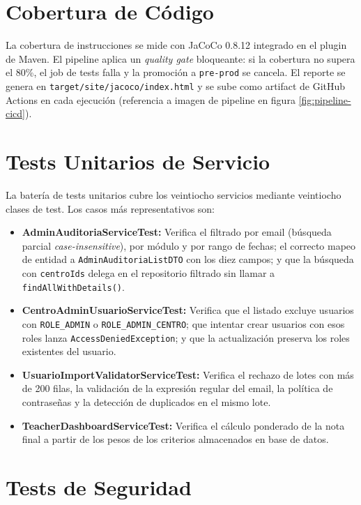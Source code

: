 \documentclass[12pt, a4paper]{report}
\begin{document}
\section{Cobertura de Código}

La cobertura de instrucciones se mide con JaCoCo 0.8.12 integrado en el plugin
de Maven. El pipeline aplica un \textit{quality gate} bloqueante: si la cobertura
no supera el 80\%, el job de tests falla y la promoción a \texttt{pre-prod} se
cancela. El reporte se genera en \texttt{target/site/jacoco/index.html} y se
sube como artifact de GitHub Actions en cada ejecución (referencia a imagen de
pipeline en figura \ref{fig:pipeline-cicd}).

\section{Tests Unitarios de Servicio}

La batería de tests unitarios cubre los veintiocho servicios mediante veintiocho
clases de test. Los casos más representativos son:

\begin{itemize}
  \item \textbf{AdminAuditoriaServiceTest:} Verifica el filtrado por email
        (búsqueda parcial \textit{case-insensitive}), por módulo y por rango de
        fechas; el correcto mapeo de entidad a \texttt{AdminAuditoriaListDTO} con
        los diez campos; y que la búsqueda con \texttt{centroIds} delega en el
        repositorio filtrado sin llamar a \texttt{findAllWithDetails()}.
  \item \textbf{CentroAdminUsuarioServiceTest:} Verifica que el listado excluye
        usuarios con \texttt{ROLE\_ADMIN} o \texttt{ROLE\_ADMIN\_CENTRO}; que
        intentar crear usuarios con esos roles lanza \texttt{AccessDeniedException};
        y que la actualización preserva los roles existentes del usuario.
  \item \textbf{UsuarioImportValidatorServiceTest:} Verifica el rechazo de lotes
        con más de 200 filas, la validación de la expresión regular del email, la
        política de contraseñas y la detección de duplicados en el mismo lote.
  \item \textbf{TeacherDashboardServiceTest:} Verifica el cálculo ponderado de la
        nota final a partir de los pesos de los criterios almacenados en base de
        datos.
\end{itemize}

\section{Tests de Seguridad}
\end{document}
